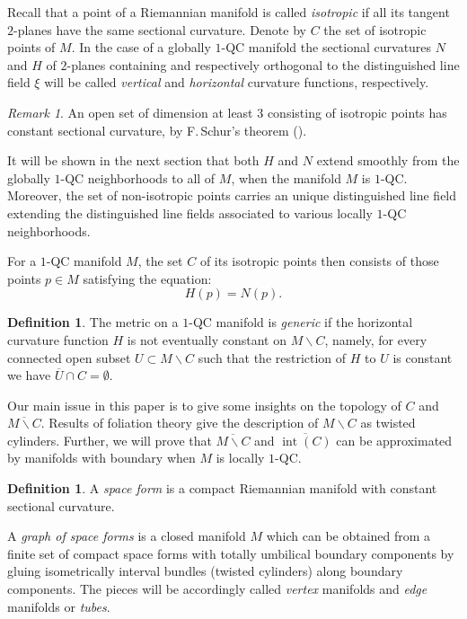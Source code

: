 \documentclass[10pt]{amsart}
\let\moins\smallsetminus
\DeclareMathOperator{\inte}{int}
\theoremstyle{definition}
\newtheorem{definition}[theorem]{Definition}
\theoremstyle{remark}
\newtheorem{remark}[theorem]{Remark}
\numberwithin{equation}{section}
\begin{document}
Recall that a point of a Riemannian manifold is called \emph{isotropic}
if all its tangent $2$\nobreakdash-planes have the same sectional curvature.
Denote by $C$ the set of isotropic points of $M$.
In the case of a globally $1$-QC manifold the sectional curvatures $N$ and $H$
of $2$\nobreakdash-planes containing and respectively orthogonal to
the distinguished line field $\xi$ will be called \emph{vertical} and \emph{horizontal}
curvature functions, respectively.

\begin{remark}
An open set of dimension at least $3$ consisting of isotropic points has constant sectional
curvature, by F.\,Schur's theorem (\cite{Sch}).
\end{remark}

It will be shown in the next section that both $H$ and $N$ extend smoothly from the globally $1$-QC
neighborhoods to all of $M$, when the manifold $M$ is $1$-QC. Moreover, the set of non-isotropic points
carries an unique distinguished line field extending the distinguished line fields associated to various
locally $1$-QC neighborhoods.

For a $1$-QC manifold $M$, the set $C$ of its isotropic points
then consists of those points $p\in M$ satisfying the equation:
\[ H(p)=N(p).\]

\begin{definition}\label{generic}
The metric on a $1$-QC manifold is \emph{generic} if the horizontal curvature function $H$
is not eventually constant on $M\moins C$, namely, for every
connected open subset $U\subset M\moins C$ such that the restriction of $H$ to $U$ is constant
we have $\overline{U}\cap C=\emptyset$.
\end{definition}

Our main issue in this paper is to give some insights on the topology of $C$
and $\overline{M\moins C}$. Results of foliation theory give the description of $M\moins C$ as twisted cylinders.
Further, we will prove that $\overline{M\moins C}$
and $\overline{\inte (C)}$ can be approximated by manifolds with boundary when
$M$ is locally $1$-QC.

\begin{definition}
A \emph{space form} is a compact Riemannian manifold with constant sectional curvature.

A \emph{graph of space forms} is a closed manifold $M$ which can be obtained
from a finite set of compact space forms with totally umbilical
boundary components by gluing isometrically
interval bundles (twisted cylinders) along boundary components.
The pieces will be accordingly called \emph{vertex} manifolds and \emph{edge}
manifolds or \emph{tubes}.
\end{definition}
\end{document}

